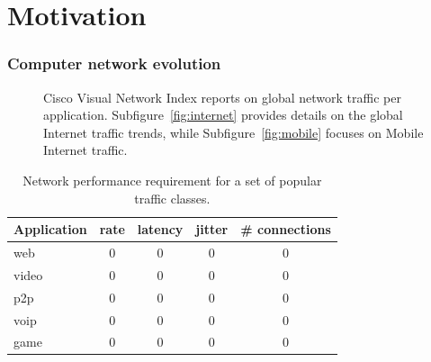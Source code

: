 \section{Motivation} \label{sec:intro:motivations}

\subsubsection*{Computer network evolution} \label{sec:intro:net_evolution}

\begin{figure}[ht] \centering {}
  \caption{Cisco Visual Network Index reports on global network traffic per
    application. Subfigure~\ref{fig:internet} provides details on the global
    Internet traffic trends, while Subfigure~\ref{fig:mobile} focuses on Mobile
    Internet traffic.} \label{fig:internet_applications} \end{figure}


\begin{table} \begin{center} \begin{tabular}{ | l | c c c c | } \hline
      Application  & rate & latency & jitter  & \# connections \\ \hline web
      & 0    & 0       & 0      & 0\\ video        & 0    & 0       & 0      &
      0\\ p2p          & 0    & 0       & 0      & 0\\ voip         & 0    & 0
      & 0      & 0\\ game         & 0    & 0       & 0      & 0\\ \hline
    \end{tabular} \end{center} \caption{Network performance requirement for a
    set of popular traffic classes.} \label{tbl:application_requirement}
\end{table}

